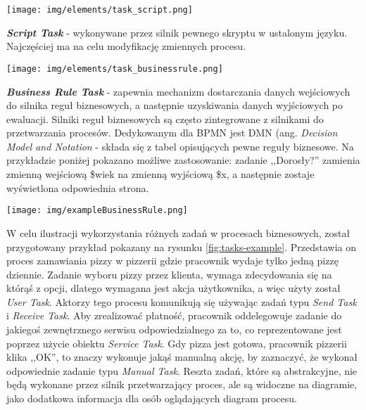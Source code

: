 \documentclass[declaration,shortabstract,mgr]{iithesis}
\newcommand{\bpmn}{BPMN }
\begin{document}
\vspace{\mypointsep}

\noindent\begin{minipage}[t]{0.1\textwidth}\vspace{0pt}
\texttt{[image: img/elements/task\_script.png]}
\end{minipage}\hfill
\begin{minipage}[t]{0.85\textwidth}\vspace{0pt}
\textbf{\textit{Script Task}} - wykonywane przez silnik pewnego skryptu w ustalonym języku. Najczęściej ma na celu modyfikację zmiennych procesu.
\end{minipage}

\vspace{\mypointsep}

\noindent\begin{minipage}[t]{0.1\textwidth}\vspace{0pt}
\texttt{[image: img/elements/task\_businessrule.png]}
\end{minipage}\hfill
\begin{minipage}[t]{0.85\textwidth}\vspace{0pt}
\textbf{\textit{Business Rule Task}} - zapewnia mechanizm dostarczania danych wejściowych do silnika reguł biznesowych, a następnie uzyskiwania danych wyjściowych po ewaluacji. Silniki reguł biznesowych są często zintegrowane z silnikami do przetwarzania procesów. Dedykowanym dla \bpmn jest DMN (ang. \textit{Decision Model and Notation} - składa się z tabel opisujących pewne reguły biznesowe. Na przykładzie poniżej pokazano możliwe zastosowanie: zadanie ,,Dorosły?'' zamienia zmienną wejściową \$wiek na zmienną wyjściową \$x, a następnie zostaje wyświetlona odpowiednia strona.
\begin{center}
\texttt{[image: img/exampleBusinessRule.png]}
\end{center}
\end{minipage}

\vspace{\mypointsep}

W celu ilustracji wykorzystania różnych zadań w procesach biznesowych, został przygotowany przykład pokazany na rysunku \ref{fig:tasks-example}. Przedstawia on proces zamawiania pizzy w pizzerii gdzie pracownik wydaje tylko jedną pizzę dziennie. Zadanie wyboru pizzy przez klienta, wymaga zdecydowania się na którąś z opcji, dlatego wymagana jest akcja użytkownika, a więc użyty został \textit{User Task}. Aktorzy tego procesu komunikują się używając zadań typu \textit{Send Task} i \textit{Receive Task}. Aby zrealizować płatność, pracownik oddelegowuje zadanie do jakiegoś zewnętrznego serwisu odpowiedzialnego za to, co reprezentowane jest poprzez użycie obiektu \textit{Service Task}. Gdy pizza jest gotowa, pracownik pizzerii klika ,,OK'', to znaczy wykonuje jakąś manualną akcję, by zaznaczyć, że wykonał odpowiednie zadanie typu \textit{Manual Task}. Reszta zadań, które są abstrakcyjne, nie będą wykonane przez silnik przetwarzający proces, ale są widoczne na diagramie, jako dodatkowa informacja dla osób oglądających diagram procesu.
\end{document}
